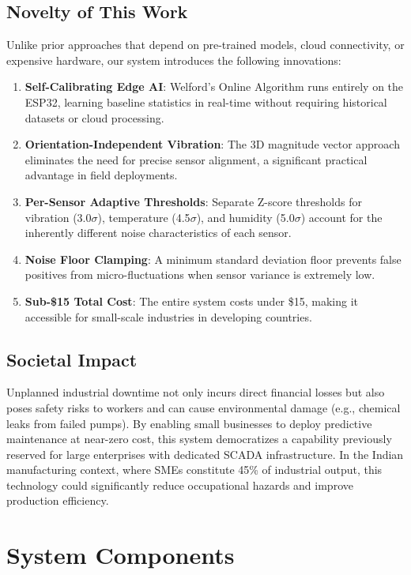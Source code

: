 \documentclass[conference]{IEEEtran}
\begin{document}
\subsection{Novelty of This Work}
Unlike prior approaches that depend on pre-trained models, cloud connectivity, or expensive hardware, our system introduces the following innovations:
\begin{enumerate}
    \item \textbf{Self-Calibrating Edge AI}: Welford's Online Algorithm runs entirely on the ESP32, learning baseline statistics in real-time without requiring historical datasets or cloud processing.
    \item \textbf{Orientation-Independent Vibration}: The 3D magnitude vector approach eliminates the need for precise sensor alignment, a significant practical advantage in field deployments.
    \item \textbf{Per-Sensor Adaptive Thresholds}: Separate Z-score thresholds for vibration (3.0$\sigma$), temperature (4.5$\sigma$), and humidity (5.0$\sigma$) account for the inherently different noise characteristics of each sensor.
    \item \textbf{Noise Floor Clamping}: A minimum standard deviation floor prevents false positives from micro-fluctuations when sensor variance is extremely low.
    \item \textbf{Sub-\$15 Total Cost}: The entire system costs under \$15, making it accessible for small-scale industries in developing countries.
\end{enumerate}

\subsection{Societal Impact}
Unplanned industrial downtime not only incurs direct financial losses but also poses safety risks to workers and can cause environmental damage (e.g., chemical leaks from failed pumps). By enabling small businesses to deploy predictive maintenance at near-zero cost, this system democratizes a capability previously reserved for large enterprises with dedicated SCADA infrastructure. In the Indian manufacturing context, where SMEs constitute 45\% of industrial output, this technology could significantly reduce occupational hazards and improve production efficiency.

\section{System Components}
\end{document}

